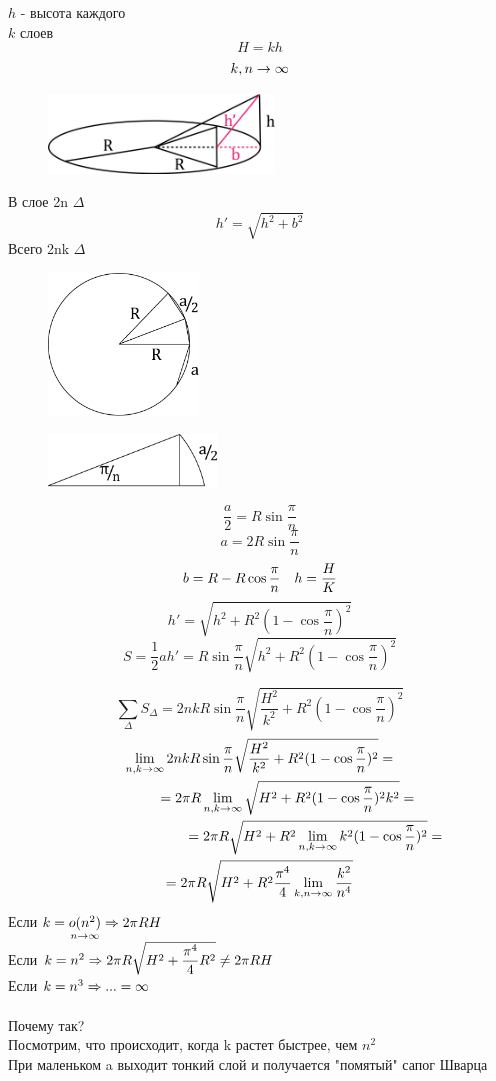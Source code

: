 \documentclass[main]{subfiles}
\begin{document}
\begin{example}[контрпример]
		$h$ - высота каждого\\
		$k$ слоев
		\[H = k h\]
		\[k,n \rightarrow \infty\]
		\begin{figure}[H]
			\centering
			\includegraphics[width=6cm]{pics/7_3.png}
		\end{figure}
		В слое 2n $\Delta$
		\[h'=\sqrt{h^2 + b^2}\]
		Всего 2nk $\Delta$
		\begin{figure}[H]
			\centering
			\includegraphics[width=4cm]{pics/7_4.png}
		\end{figure}
		\begin{figure}[H]
			\centering
			\includegraphics[width=4.5cm]{pics/7_5.png}
		\end{figure}
		\[\dfrac{a}{2} = R \sin \dfrac{\pi}{n}\]
		\[a = 2 R \sin \dfrac{\pi}{n}\]
		\[b = R - R \cos \dfrac{\pi}{n} \quad h = \dfrac{H}{K}\]
		\[h' = \sqrt{h^2 + R^2 (1-\cos \dfrac{\pi}{n})^2}\]
		\[S = \dfrac{1}{2} a h' = R \sin \dfrac{\pi}{n} \sqrt{h^2 + R^2 (1-\cos \dfrac{\pi}{n})^2}\]

		\[\sum_{\Delta} S_{\Delta} = 2nk R \sin \dfrac{\pi}{n} \sqrt{\dfrac{H^2}{k^2} + R^2 (1-\cos \dfrac{\pi}{n})^2}\]
		\begin{multline*}
			\lim_{n,k \rightarrow \infty} 2nk R \sin \dfrac{\pi}{n} \sqrt{\dfrac{H^2}{k^2} + R^2 (1-\cos \dfrac{\pi}{n})^2} = \\
			\qquad \qquad = 2 \pi R \lim_{n,k \rightarrow \infty} \sqrt{H^2 + R^2 (1-\cos \dfrac{\pi}{n})^2 k^2} = \\
			\qquad \qquad \qquad \qquad = 2 \pi R \sqrt{H^2 + R^2 \lim_{n,k \rightarrow \infty} k^2 (1-\cos \dfrac{\pi}{n})^2} = \\
			= 2\pi R \sqrt{H^2 + R^2 \dfrac{\pi^4}{4} \lim_{k,n \rightarrow \infty} \dfrac{k^2}{n^4}}
		\end{multline*}
		Если $k=\underset{n \rightarrow \infty}{o(n^2)} \Rightarrow 2\pi RH$\\
		Если $k = n^2 \Rightarrow 2 \pi R \sqrt{H^2 + \dfrac{\pi^4}{4} R^2} \neq 2\pi R H$\\
		Если $k = n^3 \Rightarrow ... = \infty$\\ \\
		Почему так? \\
		Посмотрим, что происходит, когда k растет быстрее, чем $n^2$\\
		При маленьком a выходит тонкий слой и получается "помятый"{} сапог Шварца
	\end{example}
\end{document}
